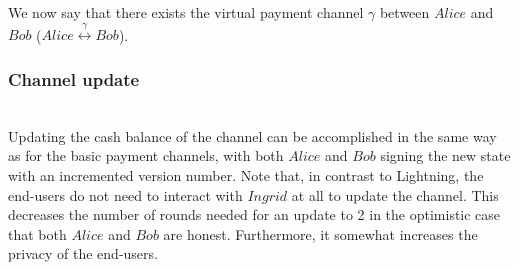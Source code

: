     We now say that there exists the virtual payment channel $\gamma$ between $Alice$ and
    $Bob$ ($Alice \overset{\gamma}{\leftrightarrow} Bob$).

  \subsubsection{Channel update} \ \\

    Updating the cash balance of the channel can be accomplished in the same way as for
    the basic payment channels, with both $Alice$ and $Bob$ signing the new state with an
    incremented version number. Note that, in contrast to Lightning, the end-users do not
    need to interact with $Ingrid$ at all to update the channel. This decreases the number
    of rounds needed for an update to 2 in the optimistic case that both $Alice$ and $Bob$
    are honest. Furthermore, it somewhat increases the privacy of the end-users.
